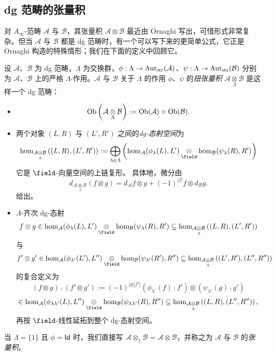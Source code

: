 \subsection{dg 范畴的张量积}
对 $A_{\infty}$-范畴 $\mathcal{A}$ 与 $\mathcal{B}$，其张量积 $\mathcal{A}\otimes\mathcal{B}$ 最近由 Ornaghi \cite{Ornaghi25} 写出，可惜形式非常复杂。但当 $\mathcal{A}$ 与 $\mathcal{B}$ 都是 dg 范畴时，有一个可以写下来的更简单公式，它正是 Ornaghi 构造的特殊情形；我们在下面的定义中回顾它。
\begin{dfn}
设 $\mathcal{A}$、$\mathcal{B}$ 为 dg 范畴，$\Lambda$ 为交换群，$\phi:\Lambda\rightarrow\operatorname{Aut}_{\operatorname{\operatorname{str}}}(\mathcal{A})$、$\psi:\Lambda\rightarrow\operatorname{Aut}_{\operatorname{\operatorname{str}}}(\mathcal{B})$ 分别为 $\mathcal{A}$、$\mathcal{B}$ 上的严格 $\Lambda$-作用。$\mathcal{A}$ 与 $\mathcal{B}$ 关于 $\Lambda$ 的作用 $\phi$、$\psi$ 的\emph{扭张量积} $\mathcal{A}\underset{\Lambda}{\otimes}\mathcal{B}$ 是这样一个 dg 范畴：

\begin{itemize}
\item
$$
\operatorname{Ob}\left(\mathcal{A}\underset{\Lambda}{\otimes}\mathcal{B}\right)
:=
\operatorname{Ob}(\mathcal{A})\times \operatorname{Ob}(\mathcal{B}).
$$

\item
两个对象 $(L,R)$ 与 $(L',R')$ 之间的\emph{dg-态射空间}为
$$
\hom_{\mathcal{A}\underset{\Lambda}{\otimes}\mathcal{B}}
\left((L,R),(L',R')\right)
:=
\displaystyle\bigoplus_{\lambda\in\Lambda}
\left(
\hom_{\mathcal{A}}(\phi_{\lambda}(L),L')
\underset{\field}{\otimes}
\hom_{\mathcal{B}}(\psi_{\lambda}(R),R')
\right)
$$
它是 $\field$-向量空间的上链复形。
具体地，微分由
$$
d_{\mathcal{A}\underset{\Lambda}{\otimes}\mathcal{B}}
(f\otimes g)
=
d_{\mathcal{A}}f \otimes g
+
(-1)^{|f|}
f \otimes d_{\mathcal{B}}g.
$$
给出。

\item
$\Lambda$-齐次 dg-态射
$$
f\otimes g
\in
\hom_{\mathcal{A}}(\phi_{\lambda}(L),L')
\underset{\field}{\otimes}
\hom_{\mathcal{B}}(\psi_{\lambda}(R),R')
\subseteq
\hom_{\mathcal{A}\underset{\Lambda}{\otimes}\mathcal{B}}
\left((L,R),(L',R')\right)
$$
与
$$
f'\otimes g'
\in
\hom_{\mathcal{A}}(\phi_{\lambda'}(L'),L'')
\underset{\field}{\otimes}
\hom_{\mathcal{B}}(\psi_{\lambda'}(R'),R'')
\subseteq
\hom_{\mathcal{A}\underset{\Lambda}{\otimes}\mathcal{B}}
\left((L',R'),(L'',R'')\right)
$$
的复合定义为
$$
(f\otimes g)\comp(f'\otimes g')
:=
(-1)^{|g||f'|}
(\phi_{\lambda'}(f)\comp f')
\otimes
(\psi_{\lambda'}(g)\comp g')
$$
$$
\in
\hom_{\mathcal{A}}(\phi_{\lambda\lambda'}(L),L'')
\underset{\field}{\otimes}
\hom_{\mathcal{B}}(\psi_{\lambda\lambda'}(R),R'')
\subseteq
\hom_{\mathcal{A}\underset{\Lambda}{\otimes}\mathcal{B}}
\left((L,R),(L'',R'')\right),
$$
再按 $\field$-线性延拓到整个 dg-态射空间。
\end{itemize}
当 $\Lambda=\{1\}$ 且 $\phi=\operatorname{\mathsf{Id}}$ 时，我们直接写 $\mathcal{A}\otimes_1\mathcal{B} =\mathcal{A}\otimes\mathcal{B}$，并称之为 $\mathcal{A}$ 与 $\mathcal{B}$ 的\emph{张量积}。
\end{dfn}

